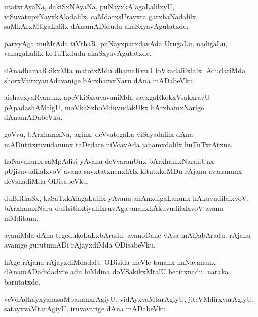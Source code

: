 \documentclass{article}
\begin{document}
\begin{mn}
utatxrAyaNa, dakiSxNAyaNa, puNayxkAlagaLalilxyU, viSuvatupxNayxkAladalilx, caMdarxsUrayxra 
garxhaNadalilx, saMkArxMtigaLalilx dAnamADidudu akaSxyavAgutatxde.
\end{mn}

\begin{mn}
parxyAga muMtAda tiVthaR, puNayxparxdavAda UrugaLu, nadigaLu, vanagaLalilx koTuTxdudu 
akaSxyavAgutatxde.
\end{mn}

\begin{mn}
dAnadhamaRkikxMta matotxMdu dhamaRvu I loVkadalilxlalx. AdudariMda shorxVtirxyanAdavanige 
bArxhamxNaru dAna mADabeVku.
\end{mn}

\begin{mn}
aishavxyaRvanunx apeVkiSxsuvavaniMda savxgaRkokxVsakxravU pApadashAMtigU, moVkaSxhoMduvudakUkx 
bArxhamxNarige dAnamADabeVku.
\end{mn}

\begin{mn}
goVvu, bArxhamxNa, aginx, deVvategaLa viSayadalilx dAna mADutitxruvudanunx taDedare niVcavAda
janamxdalilx huTuTxtAtxne.
\end{mn}

\begin{mn}
haNavanunx saMpAdisi yAvanu deVvaranUnx bArxhamxNaranUnx pUjisuvudilalxvoV avana savxtatxnenxlAlx 
kitutxkoMDu rAjanu avananunx deVshadiMda ODisabeVku.
\end{mn}

\begin{mn}
duBiRkaSx, kaSaTxkAlagaLalilx yAvanu anAnxdigaLanunx hAkuvudilalxvoV, bArxhamxNaru 
duHsithxtiyalilxruvAga ananxhAkuvudilalxvoV avanu niMditanu.
\end{mn}

\begin{mn}
avaniMda dAna tegedukoLaLxbAradu. avanoDane vAsa mADabAradu. rAjanu avanige gurutumADi rAjayxdiMda 
ODisabeVku.
\end{mn}

\begin{mn}
hAge rAjanu rAjayxdiMdadalU ODisida meVle tananx haNavanunx dAnamADadidadxre adu hiMdina 
doVSakikxMtalU hecicxnadu. naraka barutatxde.
\end{mn}

\begin{mn}
veVdAdhayxyanasaMpananxrAgiyU, vidAyxvaMtarAgiyU, jiteVMdirxyarAgiyU, satayxvaMtarAgiyU, iruvavarige
dAna mADabeVku.
\end{mn}
\end{document}
